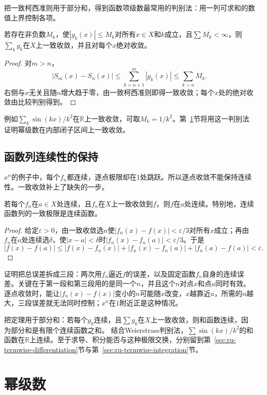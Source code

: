 把一致柯西准则用于部分和，得到函数项级数最常用的判别法：用一列可求和的数值上界控制各项。
\begin{theorem}[Weierstrass判别法]
\label{thm:ru-weierstrass-m-test}
若存在非负数$M_k$，使$|g_k(x)|\leq M_k$对所有$x\in X$和$k$成立，且$\sum M_k<\infty$，则$\sum_kg_k$在$X$上一致收敛，并且对每个$x$绝对收敛。
\end{theorem}
\begin{proof}
对$m>n$，
\[
 |S_m(x)-S_n(x)|\leq\sum_{k=n+1}^m|g_k(x)|\leq\sum_{k>n}M_k.
\]
右侧与$x$无关且随$n$增大趋于零，由一致柯西准则即得一致收敛；每个$x$处的绝对收敛由比较判别得到。
\end{proof}
例如$\sum_k\sin(kx)/k^2$在$\mathbb R$上一致收敛，可取$M_k=1/k^2$。第~\ref{sec:ru-power-series}节将用这一判别法证明幂级数在内部闭子区间上一致收敛。

\subsection{函数列连续性的保持}
\label{sec:ru-uniform-limit-continuity}

$x^n$的例子中，每个$f_n$都连续，逐点极限却在$1$处跳跃。所以逐点收敛不能保持连续性。一致收敛补上了缺失的一步。
\begin{theorem}[一致极限保持连续]
\label{thm:ru-uniform-limit-continuity}
若每个$f_n$在$a\in X$处连续，且$f_n$在$X$上一致收敛到$f$，则$f$在$a$处连续。特别地，连续函数列的一致极限是连续函数。
\end{theorem}
\begin{proof}
给定$\varepsilon>0$，由一致收敛选$n$使$|f_n(x)-f(x)|<\varepsilon/3$对所有$x$成立；再由$f_n$在$a$处连续选$\delta$，使$|x-a|<\delta$时$|f_n(x)-f_n(a)|<\varepsilon/3$。于是
\[
 |f(x)-f(a)|\leq|f(x)-f_n(x)|+|f_n(x)-f_n(a)|+|f_n(a)-f(a)|<\varepsilon.
\]
\end{proof}
证明把总误差拆成三段：两次用$f_n$逼近$f$的误差，以及固定函数$f_n$自身的连续误差。关键在于第一段和第三段用的是同一个$n$，并且这个$n$对点$x$和点$a$同时有效。
逐点收敛时，能让$|f_n(x)-f(x)|$变小的$n$可能随$x$改变，$x$越靠近$a$，所需的$n$越大，三段误差就无法同时控制；$x^n$在$1$附近正是这种情况。

把定理用于部分和：若每个$g_k$连续，且$\sum g_k$在$X$上一致收敛，则和函数连续，因为部分和是有限个连续函数之和。
结合Weierstrass判别法，$\sum\sin(kx)/k^2$的和函数在$\mathbb R$上连续。至于求导、积分能否与这种极限交换，分别留到第~\ref{sec:ru-termwise-differentiation}节与第~\ref{sec:ru-termwise-integration}节。
\section{幂级数}
\label{sec:ru-power-series}

